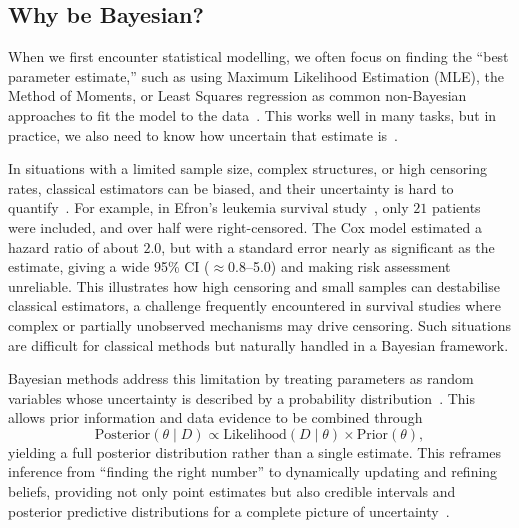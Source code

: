 


\subsection{Why be Bayesian?}\label{Why Bayesian}
When we first encounter statistical modelling, we often focus on finding the “best parameter estimate,” such as using Maximum Likelihood Estimation (MLE), the Method of Moments, or Least Squares regression as common non-Bayesian approaches to fit the model to the data~\cite{van2021bayesian}. This works well in many tasks, but in practice, we also need to know how uncertain that estimate is~\cite{gelman1995bayesian}. 

In situations with a limited sample size, complex structures, or high censoring rates, classical estimators can be biased, and their uncertainty is hard to quantify~\cite{van2021bayesian, ibrahim2013bayesian}. For example, in Efron’s leukemia survival study~\cite{Efron01091977}, only $21$ patients were included, and over half were right-censored. The Cox model estimated a hazard ratio of about $2.0$, but with a standard error nearly as significant as the estimate, giving a wide 95\% CI ($\approx$0.8–5.0) and making risk assessment unreliable. This illustrates how high censoring and small samples can destabilise classical estimators, a challenge frequently encountered in survival studies where complex or partially unobserved mechanisms may drive censoring. Such situations are difficult for classical methods but naturally handled in a Bayesian framework.

Bayesian methods address this limitation by treating parameters as random variables whose uncertainty is described by a probability distribution~\cite{gelman1995bayesian}. This allows prior information and data evidence to be combined through
$$
\text{Posterior}(\theta \mid D)
\propto
\text{Likelihood}( D \mid \theta)
\times
\text{Prior}(\theta),
$$
yielding a full posterior distribution rather than a single estimate. This reframes inference from “finding the right number” to dynamically updating and refining beliefs, providing not only point estimates but also credible intervals and posterior predictive distributions for a complete picture of uncertainty~\cite{gelman1995bayesian}.

